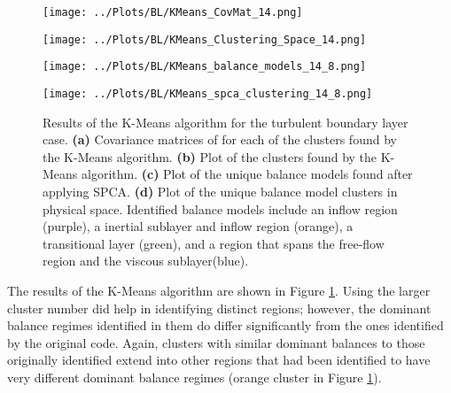 \documentclass[12pt]{report} %
\begin{document}
\begin{figure}[htbp]
  \centering

  \begin{minipage}{0.7\textwidth}
    \centering
    \texttt{[image: ../Plots/BL/KMeans\_CovMat\_14.png]}
  \end{minipage}

  \begin{minipage}{\textwidth}
      \begin{minipage}[b]{0.6\textwidth}
          \centering
          \texttt{[image: ../Plots/BL/KMeans\_Clustering\_Space\_14.png]}
          \subcaption{}
      \end{minipage}
      \begin{minipage}[b]{0.35\textwidth}
          \centering
          \texttt{[image: ../Plots/BL/KMeans\_balance\_models\_14\_8.png]}
          \subcaption{}
      \end{minipage}
  \end{minipage}

  \begin{minipage}{0.7\textwidth}
      \centering
      \texttt{[image: ../Plots/BL/KMeans\_spca\_clustering\_14\_8.png]}
      \subcaption{}
  \end{minipage}
  \caption{Results of the K-Means algorithm for the turbulent boundary layer case. \textbf{(a)} Covariance matrices of for each of the clusters found by the K-Means algorithm. \textbf{(b)} Plot of the clusters found by the K-Means algorithm. \textbf{(c)} Plot of the unique balance models found after applying SPCA. \textbf{(d)} Plot of the unique balance model clusters in physical space. Identified balance models include an inflow region (purple), a inertial sublayer and inflow region (orange), a transitional layer (green), and a region that spans the free-flow region and the viscous sublayer(blue).}

  \label{fig:KMeans_results}
\end{figure}

The results of the K-Means algorithm are shown in Figure \ref{fig:KMeans_results}. Using the larger cluster number did help in identifying distinct regions; however, the dominant balance regimes identified in them do differ significantly from the ones identified by the original code. Again, clusters with similar dominant balances to those originally identified extend into other regions that had been identified to have very different dominant balance regimes (orange cluster in Figure \ref{fig:KMeans_results}).
\end{document}
